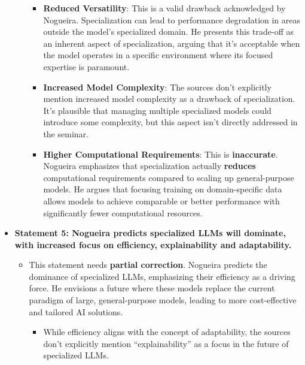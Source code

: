 \documentclass[
]{article}
\begin{document}
\begin{itemize}
\begin{itemize}
    \begin{itemize}
    
    \item
      \textbf{Reduced Versatility}: This is a valid drawback
      acknowledged by Nogueira. Specialization can lead to performance
      degradation in areas outside the model's specialized domain. He
      presents this trade-off as an inherent aspect of specialization,
      arguing that it's acceptable when the model operates in a specific
      environment where its focused expertise is paramount.
    \item
      \textbf{Increased Model Complexity}: The sources don't explicitly
      mention increased model complexity as a drawback of
      specialization. It's plausible that managing multiple specialized
      models could introduce some complexity, but this aspect isn't
      directly addressed in the seminar.
    \item
      \textbf{Higher Computational Requirements}: This is
      \textbf{inaccurate}. Nogueira emphasizes that specialization
      actually \textbf{reduces} computational requirements compared to
      scaling up general-purpose models. He argues that focusing
      training on domain-specific data allows models to achieve
      comparable or better performance with significantly fewer
      computational resources.
    \end{itemize}
  \end{itemize}
\item
  \textbf{Statement 5: Nogueira predicts specialized LLMs will dominate,
  with increased focus on efficiency, explainability and adaptability.}

  \begin{itemize}
  \item
    This statement needs \textbf{partial correction}. Nogueira predicts
    the dominance of specialized LLMs, emphasizing their efficiency as a
    driving force. He envisions a future where these models replace the
    current paradigm of large, general-purpose models, leading to more
    cost-effective and tailored AI solutions.

    \begin{itemize}
    
    \item
      While efficiency aligns with the concept of adaptability, the
      sources don't explicitly mention ``explainability'' as a focus in
      the future of specialized LLMs.
    \end{itemize}
  \end{itemize}
\end{itemize}
\end{document}
